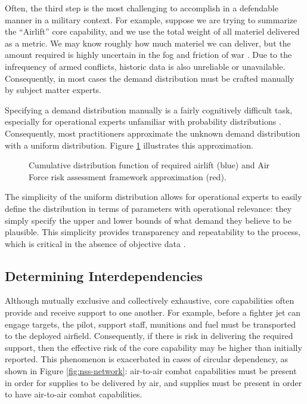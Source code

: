 \documentclass{article}
\begin{document}
Often, the third step is the most challenging to accomplish in a defendable manner in a military context. For example, suppose we are trying to summarize the ``Airlift'' core capability, and we use the total weight of all materiel delivered as a metric.  We may know roughly how much materiel we can deliver, but the amount required is highly uncertain in the fog and friction of war \citep{clausewitz}. Due to the infrequency of armed conflicts, historic data is also unreliable or unavailable. Consequently, in most cases the demand distribution must be crafted manually by subject matter experts. 

Specifying a demand distribution manually is a fairly cognitively difficult task, especially for operational experts unfamiliar with probability distributions \citep{gallagher2016improving}. Consequently, most practitioners approximate the unknown demand distribution with a uniform distribution. Figure \ref{fig:airlift-risk} illustrates this approximation. 
\begin{figure}
\centering
{}
\caption{Cumulative distribution function of required airlift (blue) and Air Force risk assessment framework approximation (red).}
\label{fig:airlift-risk}
\end{figure}
The simplicity of the uniform distribution allows for operational experts to easily define the distribution in terms of parameters with operational relevance: they simply specify the upper and lower bounds of what demand they believe to be plausible. This simplicity provides transparency and repeatability to the process, which is critical in the absence of objective data \citep{gallagher2016improving}.

\subsection{Determining Interdependencies}
Although mutually exclusive and collectively exhaustive, core capabilities often provide and receive support to one another. For example, before a fighter jet can engage targets, the pilot, support staff, munitions and fuel must be transported to the deployed airfield. Consequently, if there is risk in delivering the required support, then the effective risk of the core capability may be higher than initially reported. This phenomenon is exacerbated in cases of circular dependency, as shown in Figure \ref{fig:nss-network}: air-to-air combat capabilities must be present in order for supplies to be delivered by air, and supplies must be present in order to have air-to-air combat capabilities.
\end{document}
